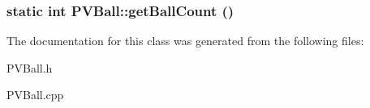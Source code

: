 \subsubsection[{getBallCount}]{\setlength{\rightskip}{0pt plus 5cm}static int PVBall::getBallCount ()\hspace{0.3cm}{\tt  [static]}}\label{class_p_v_ball_7eb5352c9f20854605387107be0552e3}




The documentation for this class was generated from the following files:\begin{CompactItemize}
\item 
PVBall.h\item 
PVBall.cpp\end{CompactItemize}
